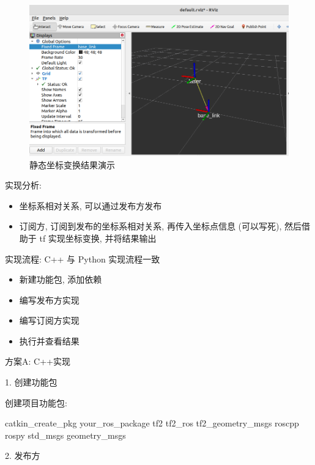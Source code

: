\documentclass[openany, fontset=windowsold]{ctexbook}
\theoremstyle{kaiti}
\theoremstyle{normal}
\begin{document}
\begin{figure}[!ht]
  \centering
  \includegraphics[width=.9\textwidth]{ros_demo_static_tf.png}
  \caption{静态坐标变换结果演示}
  \label{fig:ros_demo_static_tf}
\end{figure}

实现分析:

\begin{itemize}
  \item 坐标系相对关系, 可以通过发布方发布
  \item 订阅方, 订阅到发布的坐标系相对关系, 再传入坐标点信息 (可以写死), 然后借助于 tf 实现坐标变换, 并将结果输出
\end{itemize}

实现流程: C++ 与 Python 实现流程一致

\begin{itemize}
  \item 新建功能包, 添加依赖
  \item 编写发布方实现
  \item 编写订阅方实现
  \item 执行并查看结果
\end{itemize}

方案A: C++实现

1. 创建功能包

创建项目功能包:

\begin{bash}
  catkin_create_pkg your_ros_package tf2 tf2_ros tf2_geometry_msgs roscpp rospy std_msgs geometry_msgs
\end{bash}

2. 发布方
\end{document}
